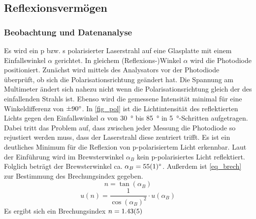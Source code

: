 \documentclass[
	a4paper,
	12pt,
	pagesize,
	ngerman
]{scrartcl}
\begin{document}
	\subsection{Reflexionsvermögen}
	\subsubsection{Beobachtung und Datenanalyse}
	Es wird ein p bzw. s polarisierter Laserstrahl auf eine Glasplatte mit einem Einfallswinkel $\alpha$ gerichtet.
	In gleichem (Reflexions-)Winkel $\alpha$ wird die Photodiode positioniert. %
	Zunächst wird mittels des Analysators vor der Photodiode überprüft, ob sich die Polarisationsrichtung geändert hat. 
	Die Spannung am Multimeter ändert sich nahezu nicht wenn die Polarisationsrichtung gleich der des einfallenden Strahls ist. 
	Ebenso wird die gemessene Intensität minimal für eine Winkeldifferenz von $\SI{\pm90}{\degree}$.
	In \cref{fig_pol} ist die Lichtintensität des reflektierten Lichts gegen den Einfallswinkel $\alpha$ von \SI{30}{\degree} bis \SI{85}{\degree} in \SI{5}{\degree}-Schritten aufgetragen.
	Dabei tritt das Problem auf, dass zwischen jeder Messung die Photodiode so rejustiert werden muss, dass der Laserstrahl diese zentriert trifft.
	Es ist ein deutliches Minimum für die Reflexion von p-polarisiertem Licht erkennbar.
	Laut der Einführung wird im Brewsterwinkel $\alpha_B$ kein p-polarisiertes Licht reflektiert.
	Folglich beträgt der Brewsterwinkel ca. $\alpha_B = \SI{55+-1}{\degree}$.
	Außerdem ist \cref{eq_brech} zur Bestimmung des Brechungsindex gegeben.
	\begin{equation}
		n= \tan(\alpha_B)
		\label{eq_brech}
	\end{equation}
	\begin{equation}
		u(n) = \frac{1}{\cos(\alpha_B)^2} \cdot u(\alpha_B)
		\label{eq_unsicher}
	\end{equation}
	Es ergibt sich ein Brechungsindex $n = \SI{1,43 +- 0,05}{}$
\end{document}
